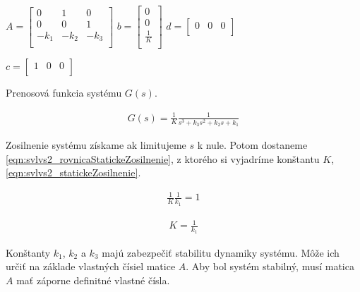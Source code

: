 \documentclass[../main.tex]{subfiles}
\begin{document}
        \begin{center}
		$ A = 
			\begin{bmatrix} 
			0 & 1 & 0 \\ 
			0 & 0 & 1 \\ 
			-k_1 & -k_2 & -k_3  \\ 
			\end{bmatrix}$
		$ b = 
			\begin{bmatrix} 
			0 \\ 
			0 \\ 
			\frac{1}{K}  \\ 
			\end{bmatrix}$
		$ d = 
			\begin{bmatrix} 
			0 & 0 & 0  \\
			\end{bmatrix}$

		$ c = 
			\begin{bmatrix} 
			1 & 0 & 0  \\
			\end{bmatrix}$
        \end{center}

Prenosová funkcia systému $G(s)$.

	\begin{equation}
		\begin{aligned}
		G(s) = \frac{1}{K}\frac{1}{s^3+k_3s^2+k_2s+k_1}
		\end{aligned}
		\label{eqn:svlvs2_linearnySystemPrenos}
	\end{equation}

Zosilnenie systému získame ak limitujeme $s$ k nule. Potom dostaneme \cref{eqn:svlvs2_rovnicaStatickeZosilnenie}, z ktorého si vyjadríme konštantu $K$,  \cref{eqn:svlvs2_statickeZosilnenie}.

	\begin{equation}
		\begin{aligned}
		\frac{1}{K}\frac{1}{k_1} = 1
		\end{aligned}
		\label{eqn:svlvs2_rovnicaStatickeZosilnenie}
	\end{equation}

	\begin{equation}
		\begin{aligned}
		K = \frac{1}{k_1}
		\end{aligned}
		\label{eqn:svlvs2_statickeZosilnenie}
	\end{equation}

Konštanty $k_1$, $k_2$ a $k_3$ majú zabezpečiť stabilitu dynamiky systému. Môže ich určiť na základe vlastných čísiel matice $A$. Aby bol systém stabilný, musí matica $A$ mať záporne definitné vlastné čísla.
\end{document}
